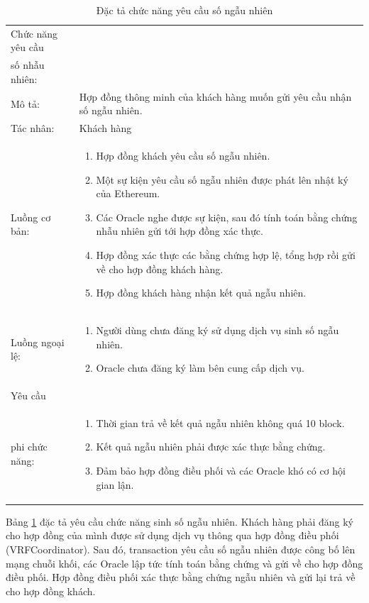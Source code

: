 \documentclass[../main.tex]{subfiles}
\begin{document}
\begin{table}[H]
\begin{tabularx}{\textwidth}{|l|X|}
Chức năng yêu cầu\\ số nhẫu nhiên:  &  \\
Mô tả:                  &Hợp đồng thông minh của khách hàng muốn gửi yêu cầu nhận số ngẫu nhiên.\\
Tác nhân:               & Khách hàng \\
Luồng cơ bản:           &
\begin{enumerate}
    \item Hợp đồng khách yêu cầu số ngẫu nhiên.
    \item Một sự kiện yêu cầu số ngẫu nhiên được phát lên nhật ký của Ethereum.
    \item Các Oracle nghe được sự kiện, sau đó tính toán bằng chứng nhẫu nhiên gửi tới hợp đồng xác thực.
    \item Hợp đồng xác thực các bằng chứng hợp lệ, tổng hợp rồi gửi về cho hợp đồng khách hàng.
    \item Hợp đồng khách hàng nhận kết quả ngẫu nhiên.
\end{enumerate}\\
Luồng ngoại lệ:         &
\begin{enumerate}
    \item Người dùng chưa đăng ký sử dụng dịch vụ sinh số ngẫu nhiên.
    \item Oracle chưa đăng ký làm bên cung cấp dịch vụ.
\end{enumerate}\\
Yêu cầu                 &\\
phi chức năng:           & 
\begin{enumerate}
    \item Thời gian trả về kết quả ngẫu nhiên không quá 10 block.
    \item Kết quả ngẫu nhiên phải được xác thực bằng chứng.
    \item Đảm bảo hợp đồng điều phối và các Oracle khó có cơ hội gian lận.
\end{enumerate}\\
\end{tabularx}
\caption{Đặc tả chức năng yêu cầu số ngẫu nhiên}
\label{table: 1}
\end{table}
Bảng \ref{table: 1} đặc tả yêu cầu chức năng sinh số ngẫu nhiên. Khách hàng phải đăng ký cho hợp đồng của mình được sử dụng dịch vụ thông qua hợp đồng điều phối (VRFCoordinator). Sau đó, transaction yêu cầu số ngẫu nhiên được công bố lên mạng chuỗi khối, các Oracle lập tức tính toán bằng chứng và gửi về cho hợp đồng điều phối. Hợp đồng điều phối xác thực bằng chứng ngẫu nhiên và gửi lại trả về cho hợp đồng khách.
\end{document}
